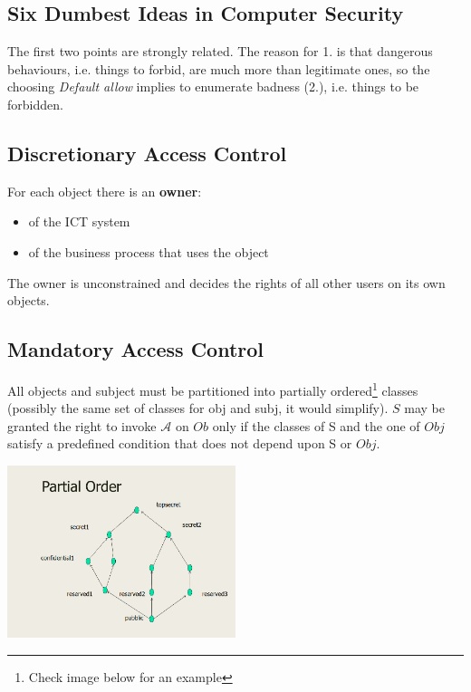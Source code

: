 \subsection{Six Dumbest Ideas in Computer Security}

The first two points are strongly related.
The reason for 1. is that dangerous behaviours, i.e. things to forbid, are much more than legitimate ones,
so the choosing \textit{Default allow} implies to enumerate badness (2.), i.e. things to be forbidden.

\subsection{Discretionary Access Control}
For each object there is an \textbf{owner}:
\begin{itemize}
    \item of the ICT system
    \item of the business process that uses the object
\end{itemize}
The owner is unconstrained and decides the rights of all other users on its own objects.

\subsection{Mandatory Access Control}
All objects and subject must be partitioned into partially ordered\footnote{Check image below for an example} classes (possibly the same set of classes for obj and subj, it would simplify).
$S$ may be granted the right to invoke $\mathcal{A}$ on $Ob$ only if the classes of S and the one of $Obj$ satisfy a predefined condition that does not depend upon S or $Obj$.

\begin{center}
    \includegraphics[width=0.5\textwidth]{images/partial_ordering.png}
\end{center}


